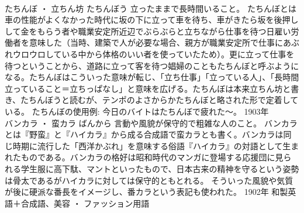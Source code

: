 \documentclass[8pt]{extreport}
\begin{document}
\begin{CJK}{UTF8}{min}
\\	たちんぼ ・ 立ちん坊	たちんぼう	立ったままで長時間いること。	たちんぼとは車の性能がよくなかった時代に坂の下に立って車を待ち、車がきたら坂を後押しして金をもらう者や職業安定所近辺でぶらぶらと立ちながら仕事を待つ日雇い労働者を意味した（当時、建築で人が必要な場合、親方が職業安定所で仕事にあぶれウロウロしている中から体格のいい者を使っていたため）。更に立って仕事を待つということから、道路に立って客を待つ娼婦のこともたちんぼと呼ぶようになる。たちんぼはこういった意味が転じ、「立ち仕事」「立っている人」、「長時間立っていること＝立ちっぱなし」と意味を広げる。たちんぼは本来立ちん坊と書き、たちんぼうと読むが、テンポのよさからかたちんぼと略された形で定着している。 たちんぼの使用例: 今日のバイトはたちんぼで疲れた～。	1903年	
\\	バンカラ ・ 蛮カラ	ばんから	言動や風貌が保守的で粗雑な人のこと。	バンカラとは『野蛮』と『ハイカラ』から成る合成語で蛮カラとも書く。バンカラは同じ時期に流行した「西洋かぶれ」を意味する俗語『ハイカラ』の対語として生まれたものである。バンカラの格好は昭和時代のマンガに登場する応援団に見られる学生服に高下駄、マントといったもので、日本古来の精神を守るという姿勢は骨太であるがハイカラに対しては保守的ともとれる。 そういった風貌や気質が後に硬派な番長をイメージし、番カラという表記も使われた。	1902年	和製英語＋合成語、美容 ・ ファッション用語	
\end{CJK}
\end{document}
